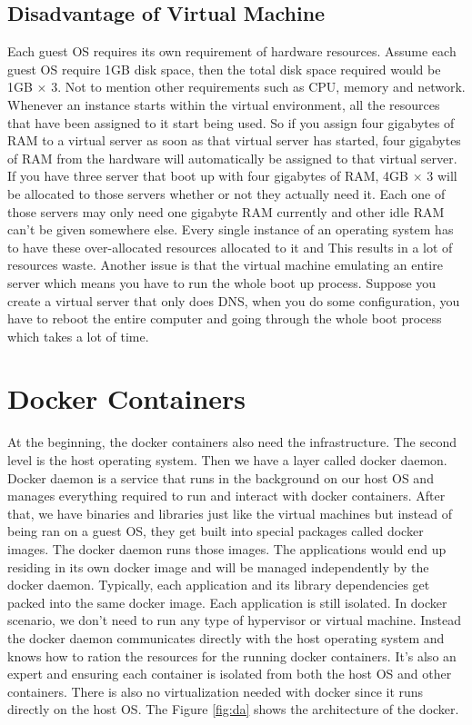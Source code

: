 \documentclass{sig-alternate}
\begin{document}
\subsection{Disadvantage of Virtual Machine}
Each guest OS requires its own requirement of hardware resources. Assume each guest OS require 1GB disk space, then the total disk space required would be 1GB $\times$ 3. Not to mention other requirements such as CPU, memory and network. Whenever an instance starts within the virtual environment, all the resources that have been assigned to it start being used. So if you assign four gigabytes of RAM to a virtual server as soon as that virtual server has started, four gigabytes of RAM from the hardware will automatically be assigned to that virtual server. If you have three server that boot up with four gigabytes of RAM, 4GB $\times$ 3 will be allocated to those servers whether or not they actually need it. Each one of those servers may only need one gigabyte RAM currently and other idle RAM can't be given somewhere else. Every single instance of an operating system has to have these over-allocated resources allocated to it and  This results in a lot of resources waste. Another issue is that the virtual machine emulating an entire server which means you have to run the whole boot up process. Suppose you create a virtual server that only does DNS, when you do some configuration, you have to reboot the entire computer and going through the whole boot process which takes a lot of time. 

\section{Docker Containers}
At the beginning, the docker containers also need the infrastructure. The second level is the host operating system. Then we have a layer called docker daemon. Docker daemon is a service that runs in the background on our host OS and manages everything required to run and interact with docker containers. After that, we have binaries and libraries just like the virtual machines but instead of being ran on a guest OS, they get built into special packages called docker images. The docker daemon runs those images. The applications would end up residing in its own docker image and will be managed independently by the docker daemon. Typically, each application and its library dependencies get packed into the same docker image. Each application is still isolated. In docker scenario, we don't need to run any type of hypervisor or virtual machine. Instead the docker daemon communicates directly with the host operating system and knows how to ration the resources for the running docker containers. It's also an expert and ensuring each container is isolated from both the host OS and other containers. There is also no virtualization needed with docker since it runs directly on the host OS. The Figure \ref{fig:da} shows the architecture of the docker. 
\end{document}
